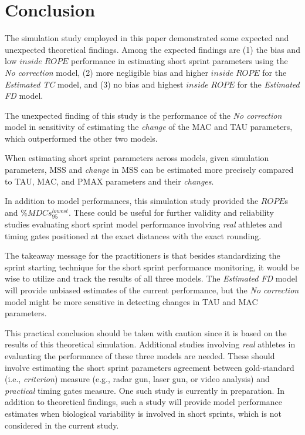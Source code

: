 \documentclass[
  letterpaper,
  DIV=11,
  numbers=noendperiod]{scrartcl}
\begin{document}
\hypertarget{conclusion}{%
\section{Conclusion}\label{conclusion}}

The simulation study employed in this paper demonstrated some expected
and unexpected theoretical findings. Among the expected findings are (1)
the bias and low \(inside \; ROPE\) performance in estimating short
sprint parameters using the \emph{No correction} model, (2) more
negligible bias and higher \(inside \; ROPE\) for the \emph{Estimated
TC} model, and (3) no bias and highest \(inside \; ROPE\) for the
\emph{Estimated FD} model.

The unexpected finding of this study is the performance of the \emph{No
correction} model in sensitivity of estimating the \emph{change} of the
MAC and TAU parameters, which outperformed the other two models.

When estimating short sprint parameters across models, given simulation
parameters, MSS and \emph{change} in MSS can be estimated more precisely
compared to TAU, MAC, and PMAX parameters and their \emph{changes}.

In addition to model performances, this simulation study provided the
\(ROPE\)s and \(\%MDCs_{95}^{lowest}\). These could be useful for
further validity and reliability studies evaluating short sprint model
performance involving \emph{real} athletes and timing gates positioned
at the exact distances with the exact rounding.

The takeaway message for the practitioners is that besides standardizing
the sprint starting technique for the short sprint performance
monitoring, it would be wise to utilize and track the results of all
three models. The \emph{Estimated FD} model will provide unbiased
estimates of the current performance, but the \emph{No correction} model
might be more sensitive in detecting changes in TAU and MAC parameters.

This practical conclusion should be taken with caution since it is based
on the results of this theoretical simulation. Additional studies
involving \emph{real} athletes in evaluating the performance of these
three models are needed. These should involve estimating the short
sprint parameters agreement between gold-standard (i.e.,
\emph{criterion}) measure (e.g., radar gun, laser gun, or video
analysis) and \emph{practical} timing gates measure. One such study is
currently in preparation. In addition to theoretical findings, such a
study will provide model performance estimates when biological
variability is involved in short sprints, which is not considered in the
current study.
\end{document}
